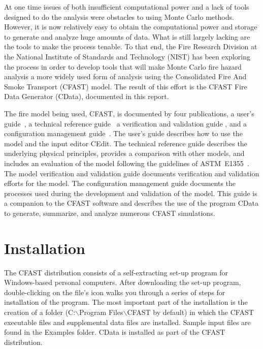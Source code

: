 \documentclass[12pt,twoside]{book}
\begin{document}
At one time issues of both insufficient computational power and a lack of tools designed to do the analysis were obstacles to using Monte Carlo methods. However, it is now relatively easy to obtain the computational power and storage to generate and analyze huge amounts of data. What is still largely lacking are the tools to make the process tenable. To that end, the Fire Research Division at the National Institute of Standards and Technology (NIST) has been exploring the process \cite{NIST_TN_2041,Reneke_2017,Reneke_2018,Cleary_2019} in order to develop tools that will make Monte Carlo fire hazard analysis a more widely used form of analysis using the Consolidated Fire And Smoke Transport (CFAST) model. The result of this effort is the CFAST Fire Data Generator (CData), documented in this report.

The fire model being used, CFAST, is documented by four publications, a user's guide~\cite{CFAST_Users_Guide_7}, a technical reference guide~\cite{CFAST_Tech_Guide_7} a verification and validation guide \cite{CFAST_Valid_Guide_7}, and a configuration management guide~\cite{CFAST_Config_Guide_7}. The user's guide describes how to use the model and the input editor CEdit. The technical reference guide describes the underlying physical principles, provides a comparison with other models, and includes an evaluation of the model following the guidelines of ASTM~E1355~\cite{CFAST:ASTM:E1355}. The model verification and validation guide documents verification and validation efforts for the model. The configuration management guide documents the processes used during the development and validation of the model. This guide is a companion to the CFAST software and describes the use of the program CData to generate, summarize, and analyze numerous CFAST simulations.

\section{Installation}

The CFAST distribution consists of a self-extracting set-up program for Windows-based personal computers. After downloading the set-up program, double-clicking on the file's icon walks you through a series of steps for installation of the program.  The most important part of the installation is the creation of a folder ({\ct C:$\backslash$Program Files$\backslash$CFAST} by default) in which the CFAST executable files and supplemental data files are installed.  Sample input files are found in the {\ct Examples} folder. CData is installed as part of the CFAST distribution.
\end{document}
